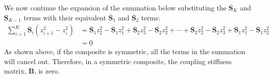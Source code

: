 \documentclass[12 pt]{article}
\begin{document}
We now continue the expansion of the summation below substituting the $\overline{\textbf{S}}_K$ and $\overline{\textbf{S}}_{K-1}$ terms with their equivalent $\overline{\textbf{S}}_1$ and $\overline{\textbf{S}}_2$ terms:
\begin{align*}
	\sum_{i=1}^K\overline{\textbf{S}}_i(z_{i+1}^2-z_i^2)&=\overline{\textbf{S}}_1z_2^2-\overline{\textbf{S}}_1z_1^2+\overline{\textbf{S}}_2z_3^2-\overline{\textbf{S}}_2z_2^2+\cdots+\overline{\textbf{S}}_2z_2^2-\overline{\textbf{S}}_2z_3^2+\overline{\textbf{S}}_1z_1^2-\overline{\textbf{S}}_1z_2^2\\
	&=0
\end{align*}
As shown above, if the composite is symmetric, all the terms in the summation will cancel out. Therefore, in a symmetric composite, the coupling stiffness matrix, \textbf{B}, is zero.
\end{document}
